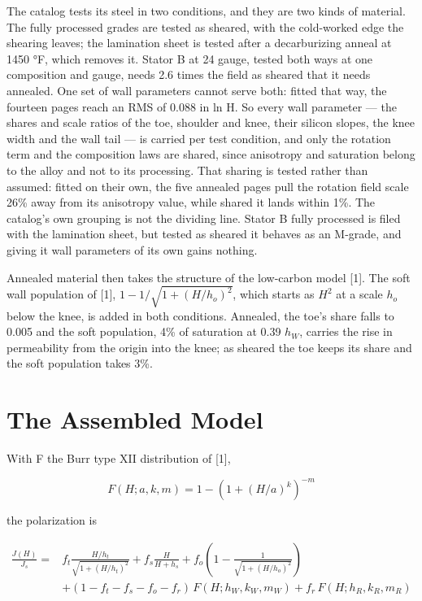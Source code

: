 \documentclass[
  11pt,
]{article}
\begin{document}
The catalog tests its steel in two conditions, and they are two kinds of material. The fully processed grades are tested as sheared, with the cold-worked edge the shearing leaves; the lamination sheet is tested after a decarburizing anneal at 1450 °F, which removes it. Stator B at 24 gauge, tested both ways at one composition and gauge, needs 2.6 times the field as sheared that it needs annealed. One set of wall parameters cannot serve both: fitted that way, the fourteen pages reach an RMS of 0.088 in ln H. So every wall parameter --- the shares and scale ratios of the toe, shoulder and knee, their silicon slopes, the knee width and the wall tail --- is carried per test condition, and only the rotation term and the composition laws are shared, since anisotropy and saturation belong to the alloy and not to its processing. That sharing is tested rather than assumed: fitted on their own, the five annealed pages pull the rotation field scale 26\% away from its anisotropy value, while shared it lands within 1\%. The catalog's own grouping is not the dividing line. Stator B fully processed is filed with the lamination sheet, but tested as sheared it behaves as an M-grade, and giving it wall parameters of its own gains nothing.

Annealed material then takes the structure of the low-carbon model {[}1{]}. The soft wall population of {[}1{]}, \(1-1/\sqrt{1+(H/h_o)^{2}}\), which starts as \(H^{2}\) at a scale \(h_o\) below the knee, is added in both conditions. Annealed, the toe's share falls to 0.005 and the soft population, 4\% of saturation at 0.39 \(h_W\), carries the rise in permeability from the origin into the knee; as sheared the toe keeps its share and the soft population takes 3\%.

\section{The Assembled Model}\label{the-assembled-model}

With F the Burr type XII distribution of {[}1{]},

\begin{equation}\label{eq7}
F(H;a,k,m) = 1-\left(1+(H/a)^{k}\right)^{-m}
\end{equation}

the polarization is

\begin{equation}\label{eq8}
\begin{split}
\frac{J(H)}{J_s} = {} & f_t\frac{H/h_t}{\sqrt{1+(H/h_t)^{2}}} + f_s\frac{H}{H+h_s} + f_o\left(1-\frac{1}{\sqrt{1+(H/h_o)^{2}}}\right) \\
& + (1-f_t-f_s-f_o-f_r)\,F(H;h_W,k_W,m_W) + f_r\,F(H;h_R,k_R,m_R)
\end{split}
\end{equation}
\end{document}
